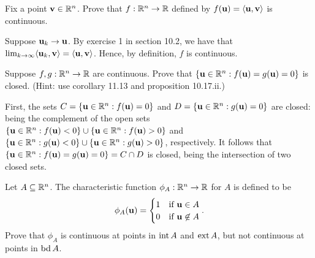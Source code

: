 \documentclass[letterpaper, twoside, 12pt]{book}
\begin{document}
\begin{exercise}[3]
  Fix a point \(\mathbf v\in\mathbb R^n\). Prove that \(f:\mathbb R^n\to\mathbb R\)
  defined by \(f(\mathbf u)=\langle\mathbf u,\mathbf v\rangle\) is continuous.
\end{exercise}

\begin{solution}
    Suppose \(\mathbf u_k \to \mathbf u\). By exercise 1 in section 10.2,
    we have that 
    \(\lim_{k \to \infty} \langle\mathbf u_k, \mathbf v\rangle = \langle\mathbf u, \mathbf v\rangle\).
    Hence, by definition, \(f\) is continuous.
\end{solution}

\begin{exercise}[6]
  Suppose \(f,g:\mathbb R^n\to\mathbb R\) are continuous. Prove that
  \(\{\mathbf u\in\mathbb R^n:f(\mathbf u)=g(\mathbf u)=0\}\) is closed.
  (Hint: use corollary 11.13 and proposition 10.17.ii.)
\end{exercise}

\begin{solution}
    First, the sets \(C = \{\mathbf u \in \mathbb R^n : f(\mathbf u) = 0\}\)
    and \(D = \{\mathbf u \in \mathbb R^n: g(\mathbf u) = 0\}\) are closed:
    being the complement of the open sets
    \(\{\mathbf u \in \mathbb R^n : f(\mathbf u) < 0\} \cup 
      \{\mathbf u \in \mathbb R^n : f(\mathbf u) > 0\} \)
    and
    \(\{\mathbf u \in \mathbb R^n : g(\mathbf u) < 0\} \cup 
      \{\mathbf u \in \mathbb R^n : g(\mathbf u) > 0\} \), respectively.
    It follows that 
    \(\{\mathbf u \in \mathbb R^n : f(\mathbf u) = g(\mathbf u) = 0\} = C \cap D\)
    is closed, being the intersection of two closed sets.
\end{solution}

\begin{exercise}[11]
  Let \(A\subseteq\mathbb R^n\). The characteristic function
  \(\phi_A:\mathbb R^n\to\mathbb R\) for \(A\) is defined to be
  \[
    \phi_A(\mathbf u) =
    \begin{cases}
      1 & \text{if } \mathbf u\in A \\
      0 & \text{if } \mathbf u\not\in A
    \end{cases}
  .\]
  Prove that \(\phi_A\) is continuous at points in \(\operatorname{int} A\)
  and \(\operatorname{ext} A\), but not continuous at points in \(\operatorname{bd} A\).
\end{exercise}
\end{document}

